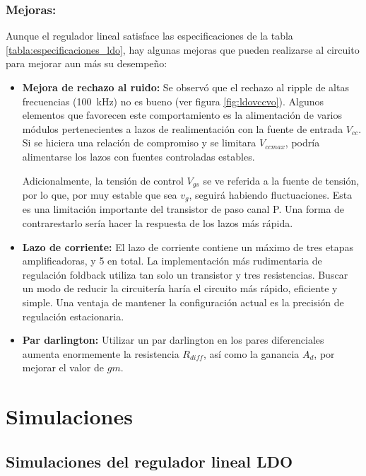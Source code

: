 \documentclass[]{article}
\begin{document}
	\subsubsection{Mejoras:}
	Aunque el regulador lineal satisface las especificaciones de la tabla \ref{tabla:especificaciones_ldo}, hay algunas mejoras que pueden realizarse al circuito para mejorar aun más su desempeño:
	
	\begin{itemize}
		\item \textbf{Mejora de rechazo al ruido:} Se observó que el rechazo al ripple de altas frecuencias (\SI{100}{\kilo\hertz}) no es bueno (ver figura \ref{fig:ldovccvo}). Algunos elementos que favorecen este comportamiento es la alimentación de varios módulos pertenecientes a lazos de realimentación con la fuente de entrada $V_{cc}$. Si se hiciera una relación de compromiso y se limitara $V_{cc max}$, podría alimentarse los lazos con fuentes controladas estables.
		
		Adicionalmente, la tensión de control $V_{gs}$ se ve referida a la fuente de tensión, por lo que, por muy estable que sea $v_g$, seguirá habiendo fluctuaciones. Esta es una limitación importante del transistor de paso canal P. Una forma de contrarestarlo sería hacer la respuesta de los lazos más rápida.
		
		\item \textbf{Lazo de corriente:} El lazo de corriente contiene un máximo de tres etapas amplificadoras, y 5 en total. La implementación más rudimentaria de regulación foldback utiliza tan solo un transistor y tres resistencias. Buscar un modo de reducir la circuitería haría el circuito más rápido, eficiente y simple. Una ventaja de mantener la configuración actual es la precisión de regulación estacionaria.
		
		\item \textbf{Par darlington:} Utilizar un par darlington en los pares diferenciales aumenta enormemente la resistencia $R_{diff}$, así como la ganancia $A_{d}$, por mejorar el valor de $gm$.
	\end{itemize}
	

	
	\section{Simulaciones}
	\label{sec:simulaciones}
	
	\subsection{Simulaciones del regulador lineal LDO}
	\FloatBarrier
	\FloatBarrier
\end{document}
